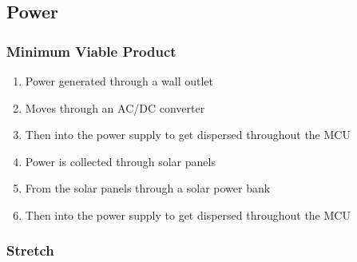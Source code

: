 \subsection{Power}
\subsubsection{Minimum Viable Product}
\begin{enumerate}
  \item Power generated through a wall outlet
  \item Moves through an AC/DC converter 
  \item Then into the power supply to get dispersed throughout the MCU 
  \item Power is collected through solar panels
  \item From the solar panels through a solar power bank 
  \item Then into the power supply to get dispersed throughout the MCU
\end{enumerate}
\subsubsection{Stretch}

